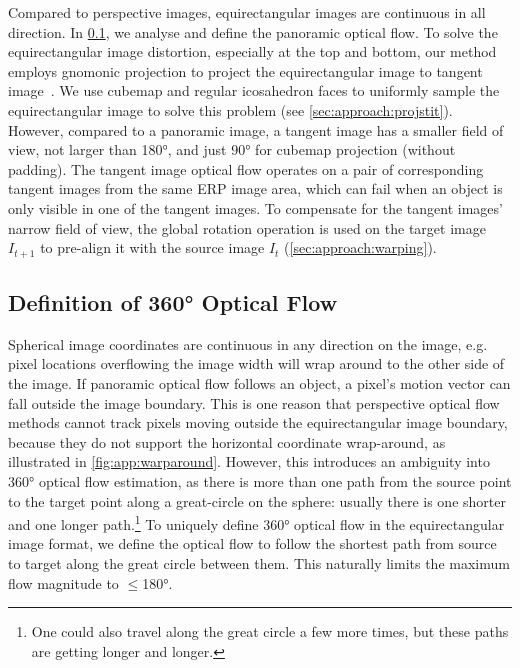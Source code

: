 Compared to perspective images, equirectangular images are continuous in all direction.
In \cref{sec:approach:definition}, we analyse and define the panoramic optical flow.
To solve the equirectangular image distortion, especially at the top and bottom, our method employs gnomonic projection to project the equirectangular image to tangent image~\cite{EderSLF2020}.
We use cubemap and regular icosahedron faces to uniformly sample the equirectangular image to solve this problem (see \cref{sec:approach:projstit}).
However, compared to a panoramic image, a tangent image has a smaller field of view, not larger than 180°, and just 90° for cubemap projection (without padding).
The tangent image optical flow operates on a pair of corresponding  tangent images from the same ERP image area,
which can fail when an object is only visible in one of the tangent images.
To compensate for the tangent images' narrow field of view, the global rotation operation is used on the target image $I_{t+1}$ to pre-align it with the source image $I_t$ (\cref{sec:approach:warping}).


\subsection{Definition of 360° Optical Flow}
\label{sec:approach:definition}

Spherical image coordinates are continuous in any direction on the image, e.g. pixel locations overflowing the image width will wrap around to the other side of the image.
If panoramic optical flow follows an object, a pixel's motion vector can fall outside the image boundary.
This is one reason that perspective optical flow methods cannot track pixels moving outside the equirectangular image boundary, because they do not support the horizontal coordinate wrap-around, as illustrated in \cref{fig:app:warparound}.
However, this introduces an ambiguity into 360° optical flow estimation, 
as there is more than one path from the source point to the target point along a great-circle on the sphere:
usually there is one shorter and one longer path.\footnote{One could also travel along the great circle a few more times, but these paths are getting longer and longer.}
To uniquely define 360° optical flow in the equirectangular image format, we define the optical flow to follow the shortest path from source to target along the great circle between them.
This naturally limits the maximum flow magnitude to $\leq$180°.



